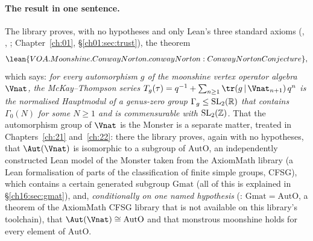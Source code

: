 \paragraph{The result in one sentence.}  The library proves, with no hypotheses and only Lean's three standard
axioms (, , ; Chapter~\ref{ch:01}, \S\ref{ch01:sec:trust}), the theorem
\begin{equation*}
  \lean{VOA.Moonshine.ConwayNorton.conwayNorton : ConwayNortonConjecture},
\end{equation*}
which says: \emph{for every automorphism $g$ of the moonshine vertex operator algebra $\Vnat$, the McKay--Thompson
series $T_g(\tau)=q^{-1}+\sum_{n\ge1}\tr(g\,|\,\Vnat_{n+1})\,q^n$ is the normalised Hauptmodul of a genus-zero group
$\Gamma_g\le\mathrm{SL}_2(\mathbb{R})$ that contains $\Gamma_0(N)$ for some $N\ge1$ and is commensurable with $\mathrm{SL}_2(\mathbb{Z})$.}
That the automorphism group of $\Vnat$ is the Monster is a separate matter, treated in Chapters~\ref{ch:21}
and~\ref{ch:22}: there the library proves, again with no hypotheses, that $\Aut(\Vnat)$ is isomorphic to a subgroup
of $\mathrm{AutO}$, an independently constructed Lean model of the Monster taken from the AxiomMath library (a Lean
formalisation of parts of the classification of finite simple groups, CFSG), which contains a certain generated
subgroup $\mathrm{Gmat}$ (all of this is explained in \S\ref{ch16:sec:gmat}), and,
\emph{conditionally on one named hypothesis} (: $\mathrm{Gmat}=\mathrm{AutO}$, a theorem of the
AxiomMath CFSG library that is not available on this library's toolchain), that $\Aut(\Vnat)\cong\mathrm{AutO}$ and
that monstrous moonshine holds for every element of $\mathrm{AutO}$.

